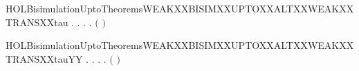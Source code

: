 \newcommand{\HOLBisimulationUptoTheoremsWEAKXXBISIMXXUPTOXXALTXXWEAKXXTRANSXXlabelYY}{\UseVerbatim{HOLBisimulationUptoTheoremsWEAKXXBISIMXXUPTOXXALTXXWEAKXXTRANSXXlabelYY}}
\begin{SaveVerbatim}{HOLBisimulationUptoTheoremsWEAKXXBISIMXXUPTOXXALTXXWEAKXXTRANSXXtau}
\HOLTokenTurnstile{} \HOLSymConst{\HOLTokenForall{}}.
         \HOLSymConst{\HOLTokenImp{}}
       \HOLSymConst{\HOLTokenForall{}} .
              \HOLSymConst{\HOLTokenImp{}}
           \HOLSymConst{\HOLTokenForall{}}.
                \HOLTokenWeakTransBegin\HOLConst{\ensuremath{\tau}}\HOLTokenWeakTransEnd {} \HOLSymConst{\HOLTokenImp{}}
               \HOLSymConst{\HOLTokenExists{}}.
                      \HOLSymConst{\HOLTokenConj{}}
                   \ensuremath{(}    \ensuremath{)}  
\end{SaveVerbatim}
\newcommand{\HOLBisimulationUptoTheoremsWEAKXXBISIMXXUPTOXXALTXXWEAKXXTRANSXXtau}{\UseVerbatim{HOLBisimulationUptoTheoremsWEAKXXBISIMXXUPTOXXALTXXWEAKXXTRANSXXtau}}
\begin{SaveVerbatim}{HOLBisimulationUptoTheoremsWEAKXXBISIMXXUPTOXXALTXXWEAKXXTRANSXXtauYY}
\HOLTokenTurnstile{} \HOLSymConst{\HOLTokenForall{}}.
         \HOLSymConst{\HOLTokenImp{}}
       \HOLSymConst{\HOLTokenForall{}} .
              \HOLSymConst{\HOLTokenImp{}}
           \HOLSymConst{\HOLTokenForall{}}.
                \HOLTokenWeakTransBegin\HOLConst{\ensuremath{\tau}}\HOLTokenWeakTransEnd {} \HOLSymConst{\HOLTokenImp{}}
               \HOLSymConst{\HOLTokenExists{}}.
                      \HOLSymConst{\HOLTokenConj{}}
                   \ensuremath{(}    \ensuremath{)}  
\end{SaveVerbatim}
